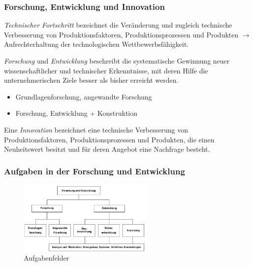\documentclass[11pt]{article}
\begin{document}
\subsubsection{Forschung, Entwicklung und Innovation}
\label{sec:org193ee77}
\emph{Technischer Fortschritt} bezeichnet die Veränderung und zugleich technische Verbesserung von Produktionsfaktoren, Produktionsprozessen und Produkten \(\rightarrow\) Aufrechterhaltung der technologischen Wettbewerbsfähigkeit.

\emph{Forschung} und \emph{Entwicklung} beschreibt die systematische Gewinnung neuer wissenschaftlicher und technischer Erkenntnisse, mit deren Hilfe die unternehmerischen Ziele besser als bisher erreicht werden.
\begin{itemize}
\item Grundlagenforschung, angewandte Forschung
\item Forschung, Entwicklung + Konstruktion
\end{itemize}

Eine \emph{Innovation} bezeichnet eine technische Verbesserung von Produktionsfaktoren, Produktionsprozessen und Produkten, die einen Neuheitswert besitzt und für deren Angebot eine Nachfrage besteht.

\subsubsection{Aufgaben in der Forschung und Entwicklung}
\label{sec:org405069e}
\begin{figure}[htbp]
\centering
\includegraphics[width=250px]{./pictures/inaufg.png}
\caption{Aufgabenfelder}
\end{figure} 
\end{document}
